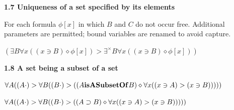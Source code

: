 \documentclass{article}
\begin{document}
\par\bigskip{}\label{uniquenessByMembership}
\noindent\textbf{1.7 Uniqueness of a set specified by its elements}\par\smallskip
For each formula $\phi[x]$ in which $B$ and $C$ do not occur free. Additional parameters are permitted; bound variables are renamed to avoid capture.

\begingroup\small
\begin{fitchproof}

\open
{}
\end{fitchproof}
\par\medskip
\begin{fitchproof*}
\close
{}
\open
{}
\close
{}
\end{fitchproof*}
\endgroup

\noindent\(\displaystyle (\exists B\forall x((x\owns B)\diamond\phi[x])>\exists^{\times}B\forall x((x\owns B)\diamond\phi[x]))\)\par

\par\bigskip{}\label{aSetBeingASubsetOfASet}
\noindent\textbf{1.8 A set being a subset of a set}\par\smallskip
\noindent\(\displaystyle \forall A((A\mathbin{\cdot})>\forall B((B\mathbin{\cdot})>((A\mathbf{isASubsetOf} B)\diamond\forall x((x\owns A)>(x\owns B)))))\)\par
\noindent\(\displaystyle \forall A((A\mathbin{\cdot})>\forall B((B\mathbin{\cdot})>((A\supset B)\diamond\forall x((x\owns A)>(x\owns B)))))\)\par
\end{document}
